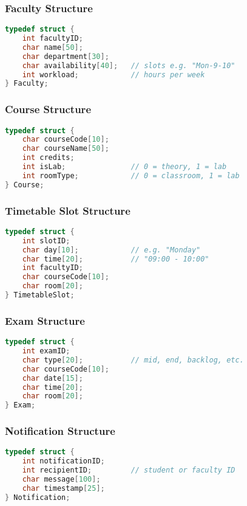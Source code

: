 \documentclass[12pt]{article}
\begin{document}
\subsubsection{Faculty Structure}
\begin{lstlisting}[language=C]
typedef struct {
    int facultyID;
    char name[50];
    char department[30];
    char availability[40];   // slots e.g. "Mon-9-10"
    int workload;            // hours per week
} Faculty;
\end{lstlisting}

\subsubsection{Course Structure}
\begin{lstlisting}[language=C]
typedef struct {
    char courseCode[10];
    char courseName[50];
    int credits;
    int isLab;               // 0 = theory, 1 = lab
    int roomType;            // 0 = classroom, 1 = lab
} Course;
\end{lstlisting}

\subsubsection{Timetable Slot Structure}
\begin{lstlisting}[language=C]
typedef struct {
    int slotID;
    char day[10];            // e.g. "Monday"
    char time[20];           // "09:00 - 10:00"
    int facultyID;
    char courseCode[10];
    char room[20];
} TimetableSlot;
\end{lstlisting}

\subsubsection{Exam Structure}
\begin{lstlisting}[language=C]
typedef struct {
    int examID;
    char type[20];           // mid, end, backlog, etc.
    char courseCode[10];
    char date[15];
    char time[20];
    char room[20];
} Exam;
\end{lstlisting}

\subsubsection{Notification Structure}
\begin{lstlisting}[language=C]
typedef struct {
    int notificationID;
    int recipientID;         // student or faculty ID
    char message[100];
    char timestamp[25];
} Notification;
\end{lstlisting}
\end{document}
